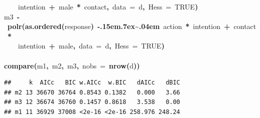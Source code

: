 \documentclass{article}
\makeatletter
\newcommand{\hlnumber}[1]{\textcolor[rgb]{0,0,0}{#1}}%
\newcommand{\hlfunctioncall}[1]{\textcolor[rgb]{.5,0,.33}{\textbf{#1}}}%
\newcommand{\hlkeyword}[1]{\textbf{#1}}%
\newcommand{\hlargument}[1]{\textcolor[rgb]{.69,.25,.02}{#1}}%
\newcommand{\hlassignement}[1]{\textbf{#1}}%
\newcommand{\hlsymbol}[1]{#1}%
\def\urltilda{\kern -.15em\lower .7ex\hbox{\~{}}\kern .04em}%
\newcommand{\hlstd}[1]{\textcolor[rgb]{0,0,0}{#1}}%
\newenvironment{kframe}{%
 \def\FrameCommand##1{\hskip\@totalleftmargin \hskip-\fboxsep
 \colorbox{shadecolor}{##1}\hskip-\fboxsep
     \hskip-\linewidth \hskip-\@totalleftmargin \hskip\columnwidth}%
 \MakeFramed {\advance\hsize-\width
   \@totalleftmargin\z@ \linewidth\hsize
   \@setminipage}}%
 {\par\unskip\endMakeFramed}
\newenvironment{knitrout}{}{} %
\makeatother
\begin{document}
\begin{knitrout}
{\begin{kframe}
\begin{flushleft}
\hlstd{}{\ }{\ }{\ }{\ }\hlsymbol{intention}{\ }\hlkeyword{+}{\ }\hlsymbol{male}{\ }\hlkeyword{*}{\ }\hlsymbol{contact}\hlkeyword{,}{\ }\hlargument{data}{\ }\hlargument{=}{\ }\hlsymbol{d}\hlkeyword{,}{\ }\hlargument{Hess}{\ }\hlargument{=}{\ }\hlnumber{TRUE}\hlkeyword{)}\hspace*{\fill}\\
\hlstd{}\hlsymbol{m3}{\ }\hlassignement{\usebox{\hlnormalsizeboxlessthan}-}{\ }\hlfunctioncall{polr}\hlkeyword{(}\hlfunctioncall{as.ordered}\hlkeyword{(}\hlsymbol{response}\hlkeyword{)}{\ }\hlkeyword{\urltilda{}}{\ }\hlsymbol{action}{\ }\hlkeyword{*}{\ }\hlsymbol{intention}{\ }\hlkeyword{+}{\ }\hlsymbol{contact}{\ }\hlkeyword{*}\hspace*{\fill}\\
\hlstd{}{\ }{\ }{\ }{\ }\hlsymbol{intention}{\ }\hlkeyword{+}{\ }\hlsymbol{male}\hlkeyword{,}{\ }\hlargument{data}{\ }\hlargument{=}{\ }\hlsymbol{d}\hlkeyword{,}{\ }\hlargument{Hess}{\ }\hlargument{=}{\ }\hlnumber{TRUE}\hlkeyword{)}\hspace*{\fill}\\
\hlstd{}\hspace*{\fill}\\
\hlstd{}\hlfunctioncall{compare}\hlkeyword{(}\hlsymbol{m1}\hlkeyword{,}{\ }\hlsymbol{m2}\hlkeyword{,}{\ }\hlsymbol{m3}\hlkeyword{,}{\ }\hlargument{nobs}{\ }\hlargument{=}{\ }\hlfunctioncall{nrow}\hlkeyword{(}\hlsymbol{d}\hlkeyword{)}\hlkeyword{)}\mbox{}
\normalfont
\end{flushleft}
\begin{verbatim}
##     k  AICc   BIC w.AICc  w.BIC   dAICc   dBIC
## m2 13 36670 36764 0.8543 0.1382   0.000   3.66
## m3 12 36674 36760 0.1457 0.8618   3.538   0.00
## m1 11 36929 37008 <2e-16 <2e-16 258.976 248.24
\end{verbatim}
\end{kframe}}
\end{knitrout}
\end{document}
